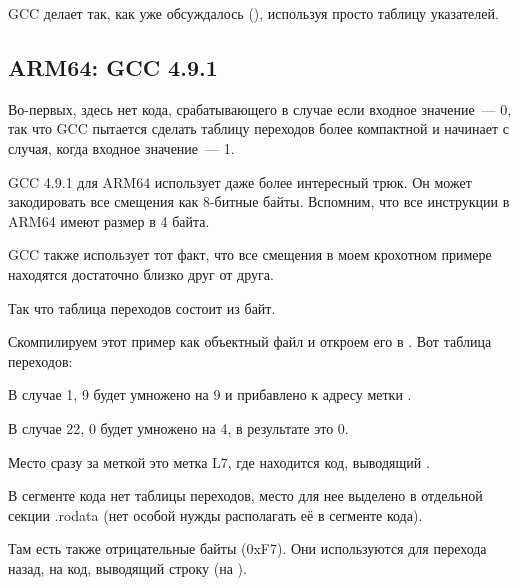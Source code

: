 GCC делает так, как уже обсуждалось (), используя просто таблицу указателей.

\subsection{ARM64: \Optimizing GCC 4.9.1}

Во-первых, здесь нет кода, срабатывающего в случае если входное значение~--- 0, так что GCC пытается
сделать таблицу переходов более компактной и начинает с случая, когда входное значение~--- 1.

GCC 4.9.1 для ARM64 использует даже более интересный трюк.
Он может закодировать все смещения как 8-битные байты.
Вспомним, что все инструкции в ARM64 имеют размер в 4 байта.

GCC также использует тот факт, что все смещения в моем крохотном примере находятся достаточно близко друг от друга.

Так что таблица переходов состоит из байт.



Скомпилируем этот пример как объектный файл и откроем его в \IDA. Вот таблица переходов:



В случае 1, 9 будет умножено на 9 и прибавлено к адресу метки .

В случае 22, 0 будет умножено на 4, в результате это 0.

Место сразу за меткой  это метка L7, где находится код, выводящий .

В сегменте кода нет таблицы переходов, место для нее выделено в отдельной секции .rodata
(нет особой нужды располагать её в сегменте кода).

Там есть также отрицательные байты (0xF7). Они используются для перехода назад, на код, выводящий
строку  (на ).

